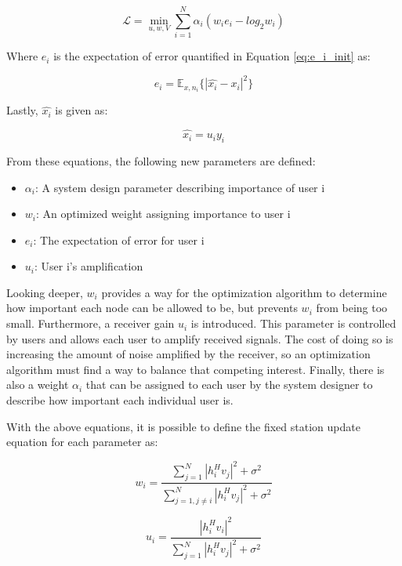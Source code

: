\documentclass[journal]{IEEEtran}
\begin{document}
\begin{equation}
\mathcal{L} = \min_{u,w,V} \sum^{N}_{i=1}\alpha_i(w_ie_i-log_2 w_i)
\label{eq:Raw_Loss}
\end{equation} 

Where $e_i$ is the expectation of error quantified in Equation \ref{eq:e_i_init} as:

\begin{equation}
e_i = \mathbb{E}_{x,n_i}\{|\hat{x_i} - x_i|^2\}
\label{eq:e_i_init}
\end{equation}

Lastly, $\hat{x_i}$ is given as:

\begin{equation}
\hat{x_i} = u_iy_i
\end{equation}

From these equations, the following new parameters are defined:
\begin{itemize}
\item{$\alpha_i$: A system design parameter describing importance of user i}
\item{$w_i$: An optimized weight assigning importance to user i}
\item{$e_i$: The expectation of error for user i}
\item{$u_i$: User i's amplification}
\end{itemize}

Looking deeper, $w_i$ provides a way for the optimization algorithm to determine how important each node can be allowed to be, but prevents $w_i$ from being too small. Furthermore, a receiver gain $u_i$ is introduced. This parameter is controlled by users and allows each user to amplify received signals. The cost of doing so is increasing the amount of noise amplified by the receiver, so an optimization algorithm must find a way to balance that competing interest. Finally, there is also a weight $\alpha_i$ that can be assigned to each user by the system designer to describe how important each individual user is. 

With the above equations, it is possible to define the fixed station update equation for each parameter as:

\begin{equation}
w_i = \frac{\sum^{N}_{j=1}|h_i^Hv_j|^2 + \sigma^2}{\sum^{N}_{j=1, j\neq i}|h_i^Hv_j|^2 + \sigma^2}
\label{eq:w_i_up}
\end{equation}

\begin{equation}
u_i = \frac{|h_i^Hv_i|^2}{\sum^{N}_{j=1}|h_i^Hv_j|^2 + \sigma^2}
\label{eq:u_i_up}
\end{equation}
\end{document}
